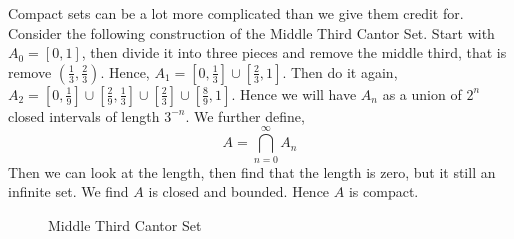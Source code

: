Compact sets can be a lot more complicated than we give them credit for. Consider the following construction of the Middle Third Cantor Set. Start with $A_0 = [0, 1]$, then divide it into three pieces and remove the middle third, that is remove $(\frac{1}{3}, \frac{2}{3})$. Hence, $A_1 = [0, \frac{1}{3}]\cup [\frac{2}{3}, 1]$. Then do it again, $A_2 = [0, \frac{1}{9}] \cup [\frac{2}{9}, \frac{1}{3}] \cup [\frac{2}{3}]\cup [\frac{8}{9}, 1]$.
Hence we will have $A_n$ as a union of $2^n$ closed intervals of length $3^{-n}$. We further define,
$$ A = \bigcap_{n=0}^\infty A_n $$
Then we can look at the length, then find that the length is zero, but it still an infinite set. We find $A$ is closed and bounded. Hence $A$ is compact.\\
\begin{figure}[!ht]
\centering
{}
\caption{Middle Third Cantor Set}
\end{figure}